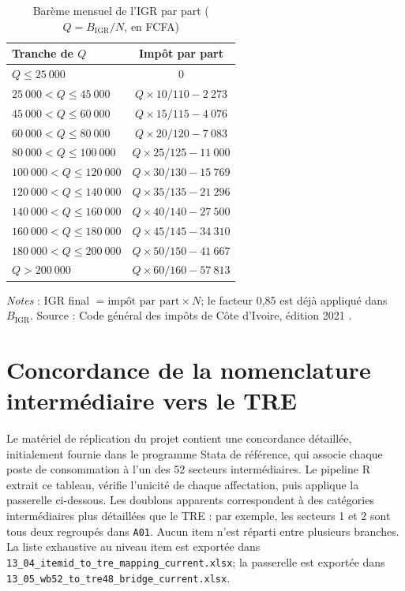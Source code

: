 \documentclass[11pt,a4paper]{article}
\begin{document}
\begin{table}[t]
\centering
\begin{threeparttable}
\caption{Barème mensuel de l'IGR par part ($Q = B_{\mathrm{IGR}}/N$, en FCFA)}
\label{tab:bareme-igr}
\begin{tabular}{lc}
\toprule
Tranche de $Q$ & Impôt par part \\
\midrule
$Q \le 25~000$            & $0$ \\
$25~000 < Q \le 45~000$   & $Q \times 10/110 - 2~273$ \\
$45~000 < Q \le 60~000$   & $Q \times 15/115 - 4~076$ \\
$60~000 < Q \le 80~000$   & $Q \times 20/120 - 7~083$ \\
$80~000 < Q \le 100~000$  & $Q \times 25/125 - 11~000$ \\
$100~000 < Q \le 120~000$ & $Q \times 30/130 - 15~769$ \\
$120~000 < Q \le 140~000$ & $Q \times 35/135 - 21~296$ \\
$140~000 < Q \le 160~000$ & $Q \times 40/140 - 27~500$ \\
$160~000 < Q \le 180~000$ & $Q \times 45/145 - 34~310$ \\
$180~000 < Q \le 200~000$ & $Q \times 50/150 - 41~667$ \\
$Q > 200~000$             & $Q \times 60/160 - 57~813$ \\
\bottomrule
\end{tabular}
\begin{tablenotes}\footnotesize
\item \emph{Notes} : IGR final $= \text{impôt par part} \times N$; le facteur 0,85 est déjà appliqué dans $B_{\mathrm{IGR}}$.
Source : Code général des impôts de Côte d'Ivoire, édition 2021 \citep{civcgi2021}.
\end{tablenotes}
\end{threeparttable}
\end{table}

\section{Concordance de la nomenclature intermédiaire vers le TRE}
\label{annexe:mapping-io}

Le matériel de réplication du projet contient une concordance détaillée,
initialement fournie dans le programme Stata de référence, qui associe chaque
poste de consommation à l'un des 52 secteurs intermédiaires. Le pipeline R
extrait ce tableau, vérifie l'unicité de chaque affectation, puis applique la
passerelle ci-dessous. Les doublons apparents correspondent à des catégories
intermédiaires plus détaillées que le TRE : par exemple, les secteurs 1 et 2
sont tous deux regroupés dans \texttt{A01}. Aucun item n'est réparti entre
plusieurs branches. La liste exhaustive au niveau item est exportée dans
\texttt{13\_04\_itemid\_to\_tre\_mapping\_current.xlsx}; la passerelle est
exportée dans \texttt{13\_05\_wb52\_to\_tre48\_bridge\_current.xlsx}.
\end{document}

